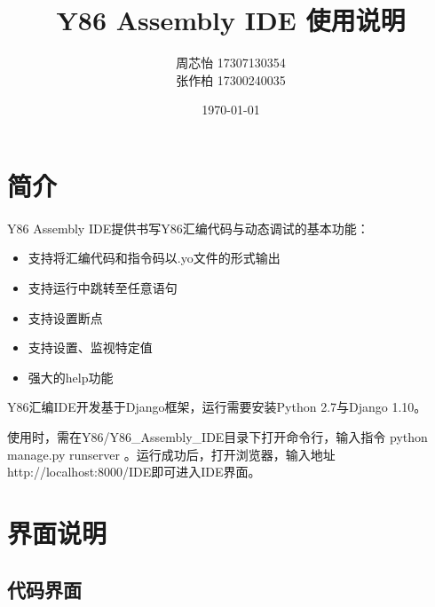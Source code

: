 \documentclass[12pt]{article} %
\title{\textbf{Y86 Assembly IDE 使用说明}}
\author{周芯怡 17307130354\\张作柏 17300240035}
\date{\today}
\begin{document}
\begin{sloppypar}
\maketitle

\section{简介}

Y86 Assembly IDE提供书写Y86汇编代码与动态调试的基本功能：
\begin{itemize}
\item 支持将汇编代码和指令码以.yo文件的形式输出
\item 支持运行中跳转至任意语句
\item 支持设置断点
\item 支持设置、监视特定值
\item 强大的help功能
\end{itemize}

Y86汇编IDE开发基于Django框架，运行需要安装Python 2.7与Django 1.10。


使用时，需在Y86/Y86\_Assembly\_IDE目录下打开命令行，输入指令 python manage.py runserver 。运行成功后，打开浏览器，输入地址 http://localhost:8000/IDE即可进入IDE界面。

\clearpage
\section{界面说明}

\subsection{代码界面}


\end{sloppypar}
\end{document}
